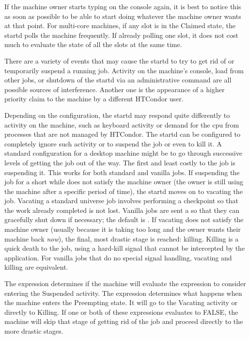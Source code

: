 If the machine owner starts typing on the console again,
it is best to notice this as
soon as possible to be able to start doing whatever 
the machine owner wants at that point.
For multi-core machines, if any slot is in the Claimed state, the
startd polls the machine frequently.
If already polling one slot, it does not
cost much to evaluate the state of all the slots at
the same time.

There are a variety of events that may cause the startd to try to get
rid of or temporarily suspend a running job.  Activity on the
machine's console, load from other jobs, or shutdown of the startd via
an administrative command are all possible sources of interference.
Another one is the appearance of a higher priority claim to the
machine by a different HTCondor user.

Depending on the configuration, the startd may respond quite
differently to activity on the machine, such as keyboard activity or
demand for the cpu from processes that are not managed by HTCondor.  The
startd can be configured to completely ignore such activity or to
suspend the job or even to kill it.  A standard configuration for a desktop
machine might be to go through
successive levels of getting the job out of the way.
The first and least costly to the job is suspending it.
This works for both standard and vanilla jobs.
If suspending the job for a short while does not satisfy the machine
owner (the owner is still using the machine after a specific period of
time), the startd moves on to vacating the job.
Vacating a standard universe job
involves performing a checkpoint so that the work already completed
is not lost.  Vanilla jobs are sent a  so that they
can gracefully shut down if necessary; the default is \verb@SIGTERM@.
If vacating does not satisfy the machine owner (usually because it is
taking too long and the owner wants their machine back \emph{now}),
the final, most drastic stage is reached: killing.  
Killing is a quick death to the job, using a hard-kill signal that cannot
be intercepted by the application.  For vanilla jobs that do no special
signal handling, vacating and killing are equivalent.

The  expression determines if the machine will
evaluate the  expression to consider entering the
Suspended activity.
The  expression determines what happens when the
machine enters the Preempting state.
It will go to the Vacating
activity or directly to Killing. 
If one or both of these expressions evaluates to FALSE, the machine
will skip that stage of getting rid of the job and proceed directly to
the more drastic stages.


